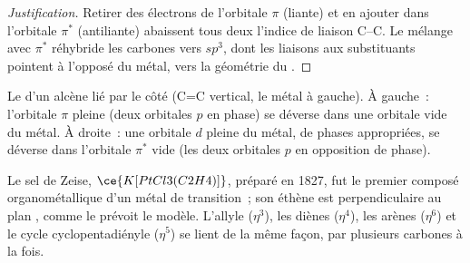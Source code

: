 \begin{proof}[Justification]
Retirer des électrons de l'orbitale $\pi$ (liante) et en ajouter dans
l'orbitale $\pi^*$ (antiliante) abaissent tous deux l'indice de liaison C--C.
Le mélange avec $\pi^*$ réhybride les carbones vers $sp^3$, dont les
liaisons aux substituants pointent à l'opposé du métal, vers la géométrie
du .
\end{proof}

\begin{omfigure}

{\small Le  d'un alcène lié par le côté
(C=C vertical, le métal à gauche). À gauche~: l'orbitale $\pi$ pleine (deux orbitales $p$
en phase) se déverse dans une orbitale vide du métal. À droite~: une
orbitale $d$ pleine du métal, de phases appropriées, se déverse dans l'orbitale $\pi^*$
vide (les deux orbitales $p$ en opposition de phase).}
\end{omfigure}

Le sel de Zeise, $\ce{K[PtCl3(C2H4)]}$, préparé en 1827, fut le premier composé
organométallique d'un métal de transition~; son éthène est perpendiculaire
au plan , comme le prévoit le modèle. L'allyle ($\eta^3$), les diènes ($\eta^4$), les arènes ($\eta^6$) et le cycle
cyclopentadiényle ($\eta^5$) se lient de la même façon, par plusieurs
carbones à la fois.

